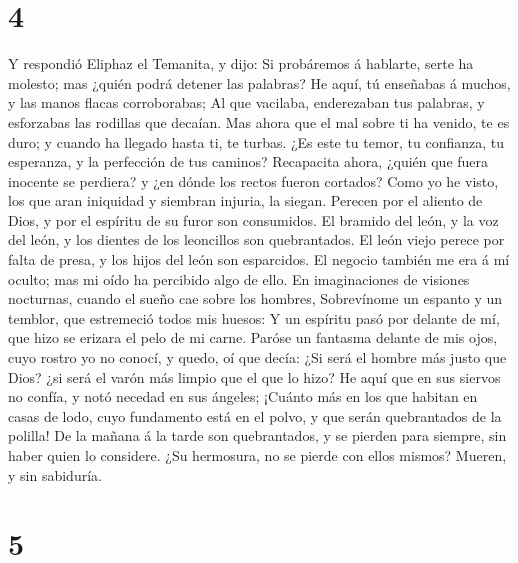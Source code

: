 \hypertarget{section-3}{%
\section{4}\label{section-3}}

 Y respondió Eliphaz el Temanita, y dijo:  Si
probáremos á hablarte, serte ha molesto; mas ¿quién podrá detener las
palabras?  He aquí, tú enseñabas á muchos, y las manos
flacas corroborabas;  Al que vacilaba, enderezaban tus
palabras, y esforzabas las rodillas que decaían.  Mas ahora
que el mal sobre ti ha venido, te es duro; y cuando ha llegado hasta ti,
te turbas.  ¿Es este tu temor, tu confianza, tu esperanza, y
la perfección de tus caminos?  Recapacita ahora, ¿quién que
fuera inocente se perdiera? y ¿en dónde los rectos fueron cortados?
 Como yo he visto, los que aran iniquidad y siembran
injuria, la siegan.  Perecen por el aliento de Dios, y por
el espíritu de su furor son consumidos.  El bramido del
león, y la voz del león, y los dientes de los leoncillos son
quebrantados.  El león viejo perece por falta de presa, y
los hijos del león son esparcidos.  El negocio también me
era á mí oculto; mas mi oído ha percibido algo de ello.  En
imaginaciones de visiones nocturnas, cuando el sueño cae sobre los
hombres,  Sobrevínome un espanto y un temblor, que
estremeció todos mis huesos:  Y un espíritu pasó por
delante de mí, que hizo se erizara el pelo de mi carne. 
Paróse un fantasma delante de mis ojos, cuyo rostro yo no conocí, y
quedo, oí que decía:  ¿Si será el hombre más justo que
Dios? ¿si será el varón más limpio que el que lo hizo?  He
aquí que en sus siervos no confía, y notó necedad en sus ángeles;
 ¡Cuánto más en los que habitan en casas de lodo, cuyo
fundamento está en el polvo, y que serán quebrantados de la polilla!
 De la mañana á la tarde son quebrantados, y se pierden
para siempre, sin haber quien lo considere.  ¿Su hermosura,
no se pierde con ellos mismos? Mueren, y sin sabiduría.

\hypertarget{section-4}{%
\section{5}\label{section-4}}

